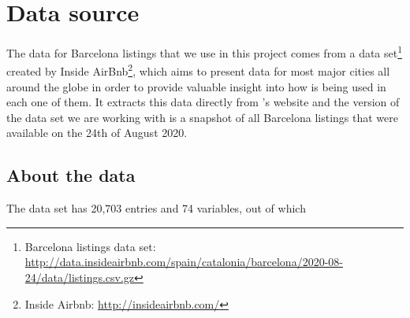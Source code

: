 

\section{Data source}%
\label{sec:data_source}

The \airbnb data for Barcelona listings that we use in this project comes from a data
set\footnote{Barcelona listings data set:
\url{http://data.insideairbnb.com/spain/catalonia/barcelona/2020-08-24/data/listings.csv.gz}} 
created by Inside AirBnb\footnote{Inside Airbnb: \url{http://insideairbnb.com/}},
which aims to present \airbnb data for most major cities all around the globe in
order to provide valuable insight into how \airbnb is being used in each one of them. It 
extracts this data directly from \airbnb's website and the version of the data set 
we are working with is a snapshot of all Barcelona listings that were available 
on the 24th of August 2020.


\subsection{About the data}%

The data set has 20,703 entries and 74 variables, out of which 